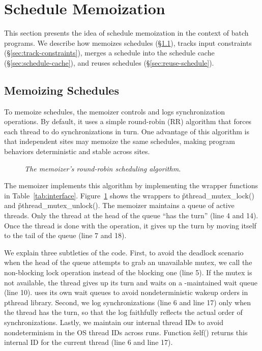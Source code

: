 \section{Schedule Memoization}  \label{sec:batch}

This section presents the idea of schedule memoization in the context of
batch programs.  We describe how \tern memoizes schedules
(\S\ref{sec:derive-schedule}), tracks input constraints
(\S\ref{sec:track-constraints}), merges a schedule into the schedule cache
(\S\ref{sec:schedule-cache}), and reuses schedules
(\S\ref{sec:reuse-schedule}).

\subsection{Memoizing Schedules}  \label{sec:derive-schedule}

To memoize schedules, the memoizer controls and logs synchronization
operations. By default, it uses a simple round-robin (RR) algorithm that
forces each thread to do synchronizations in turn.  One advantage of this
algorithm is that independent sites may memoize the same schedules, making
program behaviors deterministic and stable across sites.

\begin{figure}[t]
\tiny {}
\caption{\small \emph{The memoizer's round-robin scheduling algorithm.}}
\label{fig:memoizer}
\end{figure}

The memoizer implements this algorithm by implementing the wrapper
functions in Table~\ref{tab:interface}.  Figure~\ref{fig:memoizer} shows
the wrappers to \v{pthread\_mutex\_lock()} and
\v{pthread\_mutex\_unlock()}.  The memoizer maintains a queue of active
threads.  Only the thread at the head of the queue ``has the turn'' (line
4 and 14).  Once the thread is done with the operation, it gives up the
turn by moving itself to the tail of the queue (line 7 and 18).

We explain three subtleties of the code.  First, to avoid the deadlock
scenario when the head of the queue attempts to grab an unavailable mutex,
we call the non-blocking lock operation instead of the blocking one (line
5).  If the mutex is not available, the thread gives up its turn and waits
on a \tern-maintained wait queue (line 10).  \tern uses its own wait queues
to avoid nondeterministic wakeup orders in pthread library.  Second, we
log synchronizations (line 6 and line 17) only when the thread has the turn, so
that the log faithfully reflects the actual order of synchronizations.
Lastly, we maintain our internal thread IDs to avoid nondeterminism in the
OS thread IDs across runs.  Function \v{self()} returns this internal ID
for the current thread (line 6 and line 17).

